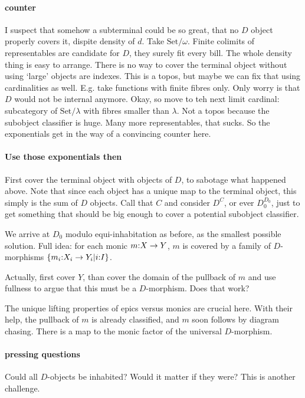 \documentclass[csh.tex]{subfiles}
\begin{document}
\paragraph{counter}
I suspect that somehow a subterminal could be so great, that no $D$ object 
properly covers it, dispite density of $d$. Take $\mathrm{Set}/\omega$. Finite colimits 
of representables are candidate for $D$, they surely fit every bill. The whole
density thing is easy to arrange. There is no way to cover the terminal object
without using `large' objects are indexes. This is a topos, but maybe we can fix 
that using cardinalities as well. E.g. take functions with finite fibres only.
Only worry is that $D$ would not be internal anymore. Okay, so move to teh next 
limit cardinal: subcategory of $\mathrm{Set}/\lambda$ with fibres smaller than $\lambda$.
Not a topos because the subobject classifier is huge. Many more representables,
that sucks. So the exponentials get in the way of a convincing counter here.

\paragraph{Use those exponentials then}
First cover the terminal object with objects of $D$, to sabotage what happened
above. Note that since each object has a unique map to the terminal object, this
simply is the sum of $D$ objects. Call that $C$ and consider $D^C$, or ever 
$D_0^{D_0}$, just to get something that should be big enough to cover
a potential subobject classifier.

We arrive at $D_0$ modulo equi-inhabitation as before, as the smallest possible
solution. Full idea: for each monic $m\mathord : X\to Y$, $m$ is covered by a family of
$D$-morphisms $\left\{ m_i\mathord : X_i\to Y_i| i\mathord : I\right\}$. 

Actually, first cover $Y$, than cover the domain of the pullback of $m$ and use 
fullness to argue that this must be a $D$-morphism. Does that work?

The unique lifting properties of epics versus monics are crucial here.
With their help, the pullback of $m$ is already classified, and $m$ soon follows
by diagram chasing. There is a map to the monic factor of the universal 
$D$-morphism. 

\paragraph{pressing questions}
Could all $D$-objects be inhabited? Would it matter if they were?
This is another challenge. 
\end{document}
